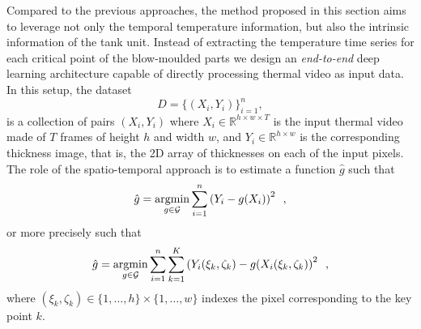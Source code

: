 Compared to the previous approaches, the method proposed in this section aims to leverage not only the temporal temperature information, but also the intrinsic information of the tank unit. Instead of extracting the temperature time series for each critical point of the blow-moulded parts we design an \textit{end-to-end} deep learning architecture capable of directly processing thermal video as input data. In this setup, the dataset
\begin{equation}
    D = \{(X_{i}, Y_{i})\}_{i=1}^{n},
\end{equation}
is a collection of pairs $(X_{i}, Y_{i})$ where $X_{i} \in \mathds{R}^{h \times w \times T}$ is the input thermal video made of $T$ frames of height $h$ and width $w$, and $Y_{i} \in \mathds{R}^{h \times w}$ is the corresponding thickness image, that is, the 2D array of thicknesses on each of the input pixels. The role of the spatio-temporal approach is to estimate a function $\hat{g}$ such that
\begin{equation}
    \hat{g} = \operatorname*{argmin}_{g\in\mathcal{G}} \sum_{i=1}^n \left( Y_{i} - g(X_{i})\right)^2 \enspace,
\end{equation}
or more precisely such that
\begin{equation}
    \hat{g} = \operatorname*{argmin}_{g\in\mathcal{G}} \sum_{i=1}^n \sum_{k=1}^K \left( Y_{i}(\xi_{k}, \zeta_{k}) - g(X_{i}(\xi_{k}, \zeta_{k})\right)^2 \enspace,
\end{equation}
where $(\xi_{k}, \zeta_{k}) \in \{1,\ldots,h\}\times\{1,\ldots,w\}$ indexes the pixel corresponding to the key point $k$.

